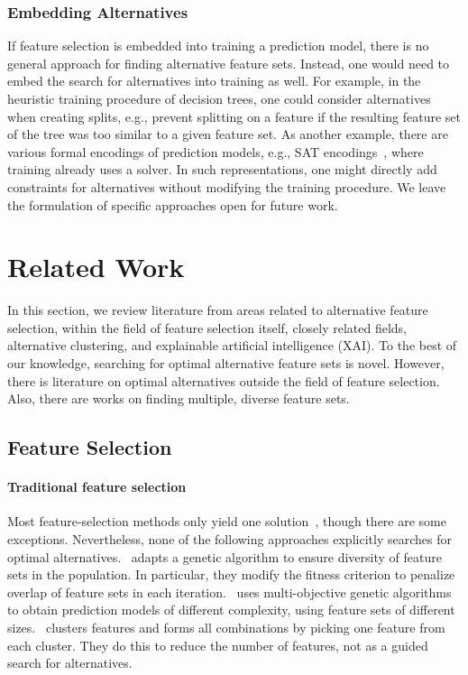 \documentclass{article}
\theoremstyle{definition}
\begin{document}
\subsubsection{Embedding Alternatives}
\label{sec:afs:approach:objectives:embedding}

If feature selection is embedded into training a prediction model, there is no general approach for finding alternative feature sets.
Instead, one would need to embed the search for alternatives into training as well.
For example, in the heuristic training procedure of decision trees, one could consider alternatives when creating splits, e.g., prevent splitting on a feature if the resulting feature set of the tree was too similar to a given feature set.
As another example, there are various formal encodings of prediction models, e.g., SAT encodings~\cite{narodytska2018learning, schidler2021sat, yu2021learning}, where training already uses a solver.
In such representations, one might directly add constraints for alternatives without modifying the training procedure.
We leave the formulation of specific approaches open for future work.

\section{Related Work}
\label{sec:afs:related-work}

In this section, we review literature from areas related to alternative feature selection, within the field of feature selection itself, closely related fields, alternative clustering, and explainable artificial intelligence (XAI).
To the best of our knowledge, searching for optimal alternative feature sets is novel.
However, there is literature on optimal alternatives outside the field of feature selection.
Also, there are works on finding multiple, diverse feature sets.

\subsection{Feature Selection}

\paragraph{Traditional feature selection}

Most feature-selection methods only yield one solution~\cite{borboudakis2021extending}, though there are some exceptions.
Nevertheless, none of the following approaches explicitly searches for optimal alternatives.
\cite{siddiqi2020genetic}~adapts a genetic algorithm to ensure diversity of feature sets in the population.
In particular, they modify the fitness criterion to penalize overlap of feature sets in each iteration.
\cite{emmanouilidis1999selecting}~uses multi-objective genetic algorithms to obtain prediction models of different complexity, using feature sets of different sizes.
\cite{mueller2021feature}~clusters features and forms all combinations by picking one feature from each cluster.
They do this to reduce the number of features, not as a guided search for alternatives.
\end{document}
